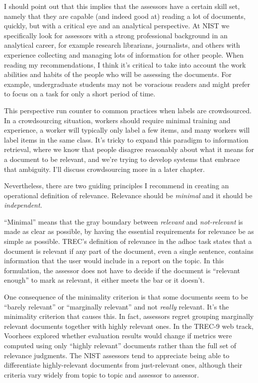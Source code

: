 \documentclass[nobib]{tufte-book}
\begin{document}
I should point out that this implies that the assessors have a certain skill set, namely that they are capable (and indeed good at) reading a lot of documents, quickly, but with a critical eye and an analytical perspective.  At NIST we specifically look for assessors with a strong professional background in an analytical career, for example research librarians, journalists, and others with experience collecting and managing lots of information for other people.  When reading my recommendations, I think it's critical to take into account the work abilities and habits of the people who will be assessing the documents.  For example, undergraduate students may not be voracious readers and might prefer to focus on a task for only a short period of time.

This perspective run counter to common practices when labels are crowdsourced. In a crowdsourcing situation, workers should require minimal training and experience, a worker will typically only label a few items, and many workers will label items in the same class.  It's tricky to expand this paradigm to information retrieval, where we know that people disagree reasonably about what it means for a document to be relevant, and we're trying to develop systems that embrace that ambiguity.  I'll discuss crowdsourcing more in a later chapter.

Nevertheless, there are two guiding principles I recommend in creating an operational definition of relevance.  Relevance should be {\em minimal} and it should be {\em independent}.

``Minimal'' means that the gray boundary between {\em relevant} and {\em not-relevant} is made as clear as possible, by having the essential requirements for relevance be as simple as possible.  TREC's definition of relevance in the adhoc task states that a document is relevant if any part of the document, even a single sentence, contains information that the user would include in a report on the topic.\autocite[chapter 2]{voorhees_trec:_2005}  In this formulation, the assessor does not have to decide if the document is ``relevant enough'' to mark as relevant, it either meets the bar or it doesn't.

One consequence of the minimality criterion is that some documents seem to be ``barely relevant'' or ``marginally relevant'' and not {\em really} relevant.  It's the minimality criterion that causes this. In fact, assessors regret grouping marginally relevant documents together with highly relevant ones.  In the TREC-9 web track, Voorhees explored whether evaluation results would change if metrics were computed using only ``highly relevant'' documents rather than the full set of relevance judgments.\autocite{voorhees_evaluation_2001}  The NIST assessors tend to appreciate being able to differentiate highly-relevant documents from just-relevant ones, although their criteria vary widely from topic to topic and assessor to assessor.
\end{document}
